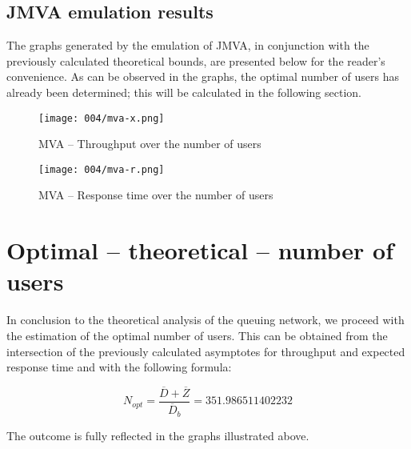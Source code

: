 \subsection{JMVA emulation results}

The graphs generated by the emulation of JMVA, in conjunction with the previously calculated theoretical bounds, are presented below for the reader's convenience.
As can be observed in the graphs, the optimal number of users has already been determined; this will be calculated in the following section.

\begin{figure}[h]
	\centering
	\texttt{[image: 004/mva-x.png]}
	\caption{MVA -- Throughput over the number of users}
\end{figure}

\begin{figure}[h]
	\centering
	\texttt{[image: 004/mva-r.png]}
	\caption{MVA -- Response time over the number of users}
\end{figure}

\clearpage

\section{Optimal -- theoretical -- number of users}

In conclusion to the theoretical analysis of the queuing network, we proceed with the estimation of the optimal number of users.
This can be obtained from the intersection of the previously calculated asymptotes for throughput and expected response time and with the following formula:

\label{eq:optimal-number-of-users}
\begin{equation}
	N_{opt} = \frac{\overline{D} + \overline{Z}}{\overline{D}_b} = \num[round-mode=places, round-precision=5]{351.986511402232}
\end{equation}

The outcome is fully reflected in the graphs illustrated above.
